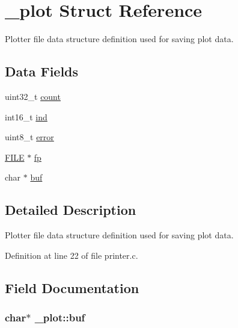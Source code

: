\hypertarget{struct__plot}{}\section{\+\_\+plot Struct Reference}
\label{struct__plot}


Plotter file data structure definition used for saving plot data.  


\subsection*{Data Fields}
\begin{DoxyCompactItemize}
\item 
uint32\+\_\+t \hyperlink{struct__plot_af4d84e2aa52eabdc7ccc2fbf18272e98}{count}
\item 
int16\+\_\+t \hyperlink{struct__plot_ab02a041a2c701b09447d883089abba4f}{ind}
\item 
uint8\+\_\+t \hyperlink{struct__plot_a9a9516230fefbc6cdd6e4ca5d6403509}{error}
\item 
\hyperlink{posix_8h_aed4dabeb9f7c518ded42f930a04abce8}{F\+I\+LE} $\ast$ \hyperlink{struct__plot_aec1bc5aae9d9c56584ee0cbb31515ac6}{fp}
\item 
char $\ast$ \hyperlink{struct__plot_ad7907cd2e279a361e68160bae8106ae4}{buf}
\end{DoxyCompactItemize}


\subsection{Detailed Description}
Plotter file data structure definition used for saving plot data. 

Definition at line 22 of file printer.\+c.



\subsection{Field Documentation}
\subsubsection[{\texorpdfstring{buf}{buf}}]{\setlength{\rightskip}{0pt plus 5cm}char$\ast$ \+\_\+plot\+::buf}\hypertarget{struct__plot_ad7907cd2e279a361e68160bae8106ae4}{}\label{struct__plot_ad7907cd2e279a361e68160bae8106ae4}


